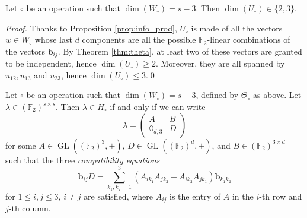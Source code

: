 \documentclass[runningheads,a4paper,english]{llncs}
\newcommand{\F}{\mathbb{F}}
\newcommand{\lb}{\lambda}
\DeclareMathOperator{\GL}{GL}
\renewcommand{\b}{\textbf{b}}
\newcommand{\wo}{W_\circ}
\newcommand{\uo}{U_\circ}
\newcommand{\ho}{H_\circ}
\newcommand{\Sum}{\sum\limits}
\begin{document}
\begin{proposition}
	Let $\circ$ be an operation such that $\dim(\wo) = s-3$. Then $\dim(\uo) \in \{2, 3\}$.
\end{proposition}
\begin{proof}
	Thanks to Proposition \ref{prop:info_prod}, $\uo$ is made of all the vectors $w \in \wo$ whose last $d$ components are all the possible $\F_2$-linear combinations of the vectors $\b_{ij}$. By Theorem \ref{thm:theta}, at least two of these vectors are granted to be independent, hence $\dim(\uo) \geq 2$. Moreover, they are all spanned by $u_{12},u_{13}$ and $u_{23}$, hence $\dim(\uo) \leq 3$.\qed
\end{proof}

\begin{theorem}
    \label{thm:caratt_ho_n3}
    Let $\circ$ be an operation such that $\dim(\wo) = s-3$, defined by $\Theta_\circ$ as above. Let $\lb \in (\F_2)^{s\times s}$. Then $\lb \in \ho$ if and only if we can write
    $$ 
    \lb = 
    \begin{pmatrix}
        A & B \\
        \mathbb{0}_{d,3} & D
    \end{pmatrix}
    $$
    for some $A \in \GL((\F_2)^3, +)$, $D \in \GL((\F_2)^d, +)$, and $B \in (\F_2)^{3 \times d}$ such that the three \emph{compatibility equations}
    \[
        \b_{ij}D = \Sum_{k_1, k_2 =1}^3 (A_{ik_1}A_{jk_2} + A_{ik_2}A_{jk_1})\b_{k_1k_2}
    \]		
    for $1 \leq i,j \leq 3$, $i \neq j$ are satisfied, where $A_{ij}$ is the entry of $A$ in the $i$-th row and $j$-th column.
\end{theorem}
\end{document}
